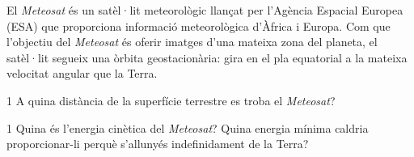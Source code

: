 El \textit{Meteosat} és un satèl·lit meteorològic llançat per l'Agència Espacial Europea (ESA) que proporciona informació meteorològica d'Àfrica i Europa. Com que l'objectiu del \textit{Meteosat} és oferir imatges d'una mateixa zona del planeta, el satèl·lit segueix una òrbita geostacionària: gira en el pla equatorial a la mateixa velocitat angular que la Terra.


\begin{apartat}{1}
A quina distància de la superfície terrestre es troba el \textit{Meteosat}?
\end{apartat}

\begin{apartat}{1}
Quina és l'energia cinètica del \textit{Meteosat}? Quina energia mínima caldria proporcionar-li perquè s'allunyés indefinidament de la Terra?
\end{apartat}

